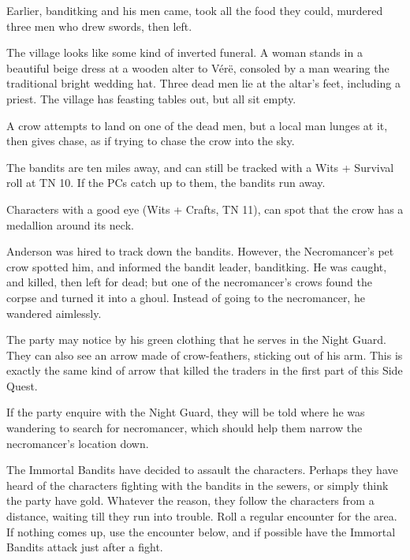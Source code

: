\begin{multicols}{2}
Earlier, \gls{banditking} and his men came, took all the food they could, murdered three men who drew swords, then left.

\begin{boxtext}

	The village looks like some kind of inverted funeral.
	A woman stands in a beautiful beige dress at a wooden alter to V\'{e}r\"{e}, consoled by a man wearing the traditional bright wedding hat.
	Three dead men lie at the altar's feet, including a priest.
	The village has feasting tables out, but all sit empty.

	A crow attempts to land on one of the dead men, but a local man lunges at it, then gives chase, as if trying to chase the crow into the sky.

\end{boxtext}

The bandits are ten miles away, and can still be tracked with a Wits + Survival roll at TN 10.
If the PCs catch up to them, the bandits run away.

Characters with a good eye (Wits + Crafts, TN 11), can spot that the crow has a medallion around its neck.


Anderson was hired to track down the bandits.
However, the Necromancer's pet crow spotted him, and informed the bandit leader, \gls{banditking}.
He was caught, and killed, then left for dead; but one of the necromancer's crows found the corpse and turned it into a ghoul.
Instead of going to the necromancer, he wandered aimlessly.

The party may notice by his green clothing that he serves in the Night Guard.
They can also see an arrow made of crow-feathers, sticking out of his arm.
This is exactly the same kind of arrow that killed the traders in the first part of this Side Quest.


If the party enquire with the Night Guard, they will be told where he was wandering to search for \gls{necromancer}, which should help them narrow the necromancer's location down.


The Immortal Bandits have decided to assault the characters.
Perhaps they have heard of the characters fighting with the bandits in the sewers, or simply think the party have gold.
Whatever the reason, they follow the characters from a distance, waiting till they run into trouble.
Roll a regular encounter for the area.
If nothing comes up, use the encounter below, and if possible have the Immortal Bandits attack just after a fight.


\end{multicols}

